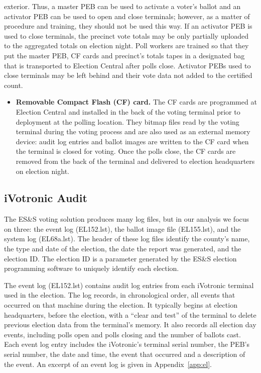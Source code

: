 exterior. Thus, a master PEB can be used to activate a voter's ballot
and an activator PEB can be used to open and close terminals; however,
as a matter of procedure and training, they should not be used this
way. If an activator PEB is used to close terminals, the precinct vote
totals may be only partially uploaded to the aggregated totals on
election night. Poll workers are trained so that they put the master
PEB, CF cards and precinct's totals tapes in a designated bag that is
transported to Election Central after polls close.  Activator PEBs
used to close terminals may be left behind and their vote data not
added to the certified count.
\begin{itemize}
\item \textbf{Removable Compact Flash (CF) card.} The CF cards are
  programmed at Election Central and installed in the back of the
  voting terminal prior to deployment at the polling location. They bitmap files
  read by the voting terminal 
  during the voting process and are also used as an external
  memory device: audit log entries and ballot images are written to
  the CF card when the terminal is closed for voting. Once the polls
  close, the CF cards are removed from the back of the terminal and
  delivered to election headquarters on election night.  

\end{itemize}

\subsection{iVotronic Audit}
\smvertspace
The ES\&S voting solution produces many log files, but in our analysis we focus
on three: the event log (EL152.lst), the ballot image file (EL155.lst), and the
system log 
(EL68a.lst).  The header of these log files identify the county's
name, the type and date of the election, the date the report was
generated, and the election ID. The election ID is a parameter
generated by the ES\&S election programming software to uniquely
identify each election.  
 
The event log (EL152.lst) contains audit log entries from each
iVotronic terminal used in the election.  The log  records, in
chronological order, all events that occurred on that machine during the
election. It typically begins at election headquarters, before the
election, with a \textquotedblleft clear and
test\textquotedblright \hspace{1 mm} of the terminal to delete
previous election data from the terminal's memory. It also records all
election day events, including polls open and polls closing and the
number of ballots cast.  Each event log entry includes the iVotronic's
terminal serial number, the PEB's serial number, the date and time,
the event that occurred and a description of the event. An excerpt of
an event log is given in  Appendix~\ref{app:el}. 
 

